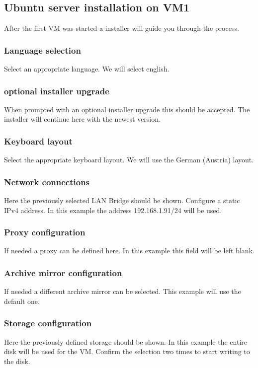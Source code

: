 \documentclass[10pt,a4paper]{article}
\begin{document}
\subsection{Ubuntu server installation on VM1}
\label{serverinstallation}
After the first VM was started a installer will guide you through the process.

\subsubsection{Language selection}
Select an appropriate language. We will select english.

\subsubsection{optional installer upgrade}
When prompted with an optional installer upgrade this should be accepted. The installer will continue here with the newest version.

\subsubsection{Keyboard layout}
Select the appropriate keyboard layout. We will use the German (Austria) layout.

\subsubsection{Network connections}
\label{networkconnections}
Here the previously selected LAN Bridge should be shown. Configure a static IPv4 address. In this example the address 192.168.1.91/24 will be used. 

\subsubsection{Proxy configuration}
If needed a proxy can be defined here. In this example this field will be left blank.

\subsubsection{Archive mirror configuration}
If needed a different archive mirror can be selected. This example will use the default one.

\subsubsection{Storage configuration}
Here the previously defined storage should be shown. In this example the entire disk will be used for the VM. Confirm the selection two times to start writing to the disk.
\end{document}
